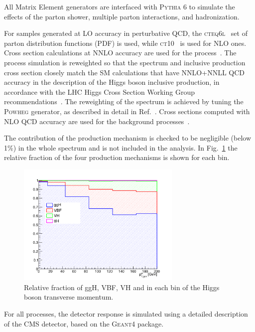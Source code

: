 All Matrix Element generators are interfaced with \textsc{Pythia 6} to simulate the effects of the parton shower, multiple parton interactions, and hadronization.

For samples generated at LO accuracy in perturbative QCD, the \textsc{cteq6l}~\cite{Lai:2010nw} set of parton distribution functions
(PDF) is used, while \textsc{ct10}~\cite{Lai:2010vv} is used for NLO ones.
Cross section calculations at NNLO accuracy are used for the \hww process~\cite{Dittmaier:2011ti}.
The \hww process simulation is reweighted so that the \pth spectrum and inclusive production cross section closely match the SM calculations that have NNLO+NNLL QCD accuracy in the description of the Higgs boson inclusive production, in accordance with the LHC Higgs Cross Section Working Group recommendations~\cite{Heinemeyer:2013tqa}.
The reweighting of the \pth spectrum is achieved by tuning the \textsc{Powheg} generator, as described in detail in Ref.~\cite{Alioli:2010xd}.
Cross sections computed with NLO QCD accuracy are used for the background processes~\cite{Heinemeyer:2013tqa}.

The contribution of the \ttH production mechanism is checked to be negligible (below 1\%) in the whole \pth spectrum and is not included in the analysis. In Fig.~\ref{fig:signal_comp} the relative fraction of the four production mechanisms is shown for each \pth bin.

\begin{figure}[htb]
\centering
\includegraphics[width=0.7\textwidth]{images/signal_composition_ttH.pdf}
\caption{Relative fraction of ggH, VBF, VH and \ttH in each bin of the Higgs boson transverse momentum.}\label{fig:signal_comp}
\end{figure}

For all processes, the detector response is simulated using a detailed description of the CMS detector, based on the \textsc{Geant4} package.


